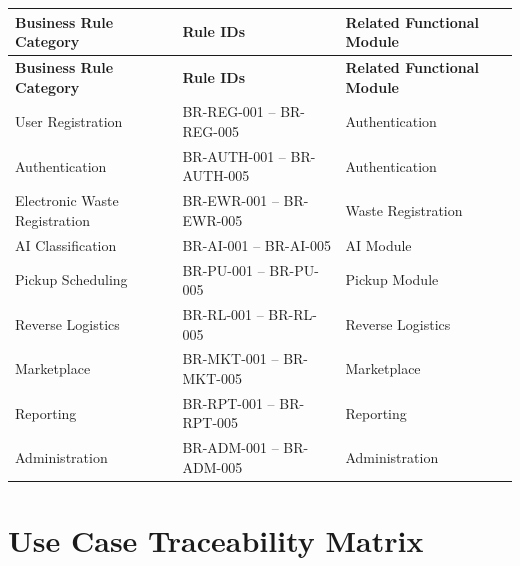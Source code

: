 \begin{longtable}{|p{5cm}|p{4cm}|p{4cm}|}

\hline
\textbf{Business Rule Category} &
\textbf{Rule IDs} &
\textbf{Related Functional Module} \\
\hline
\endfirsthead

\hline
\textbf{Business Rule Category} &
\textbf{Rule IDs} &
\textbf{Related Functional Module} \\
\hline
\endhead

User Registration &
BR-REG-001 -- BR-REG-005 &
Authentication \\
\hline

Authentication &
BR-AUTH-001 -- BR-AUTH-005 &
Authentication \\
\hline

Electronic Waste Registration &
BR-EWR-001 -- BR-EWR-005 &
Waste Registration \\
\hline

AI Classification &
BR-AI-001 -- BR-AI-005 &
AI Module \\
\hline

Pickup Scheduling &
BR-PU-001 -- BR-PU-005 &
Pickup Module \\
\hline

Reverse Logistics &
BR-RL-001 -- BR-RL-005 &
Reverse Logistics \\
\hline

Marketplace &
BR-MKT-001 -- BR-MKT-005 &
Marketplace \\
\hline

Reporting &
BR-RPT-001 -- BR-RPT-005 &
Reporting \\
\hline

Administration &
BR-ADM-001 -- BR-ADM-005 &
Administration \\
\hline

\end{longtable}

\section{Use Case Traceability Matrix}


